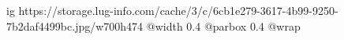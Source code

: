  
 
 
 
 

\ifcmt
  ig https://storage.lug-info.com/cache/3/c/6cb1e279-3617-4b99-9250-7b2daf4499bc.jpg/w700h474
  @width 0.4
  @parbox 0.4
  @wrap \parpic[r]
\fi
